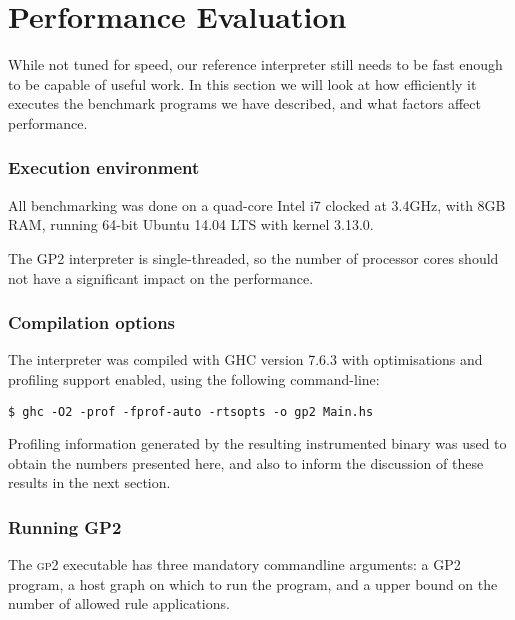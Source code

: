 \section{Performance Evaluation}\label{the-results}

While not tuned for speed, our reference interpreter still needs to be fast enough to be capable of useful work. In this section we will look at how efficiently it executes the benchmark programs we have described, and what factors affect performance.



\subsubsection*{Execution environment}

All benchmarking was done on a quad-core Intel i7 clocked at 3.4GHz, with 8GB RAM, running 64-bit Ubuntu 14.04 LTS with kernel 3.13.0.

The GP2 interpreter is single-threaded, so the number of processor cores should not have a significant impact on the performance.


\subsubsection*{Compilation options}

The interpreter was compiled with GHC version 7.6.3 with optimisations and profiling support enabled, using the following command-line:

\begin{verbatim}
$ ghc -O2 -prof -fprof-auto -rtsopts -o gp2 Main.hs
\end{verbatim}

Profiling information generated by the resulting instrumented binary was used to obtain the numbers presented here, and also to inform the discussion of these results in the next section.


\subsubsection*{Running GP2}

The \textsc{gp2} executable has three mandatory commandline arguments: a GP2 program, a host graph on which to run the program, and a upper bound on the number of allowed rule applications.

